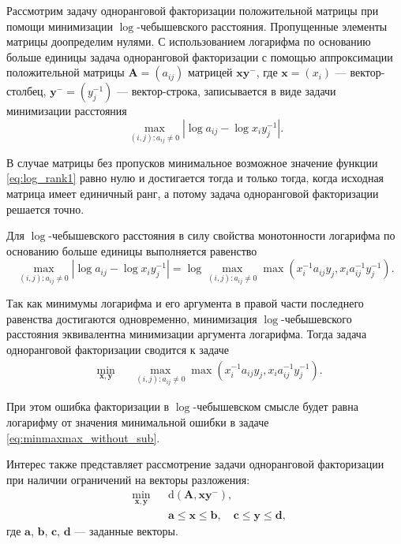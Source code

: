\documentclass[specialist,
               substylefile = spbu.rtx,
               subf,href,colorlinks=true, 12pt]{disser}
\theoremstyle{definition}
\begin{document}
Рассмотрим задачу одноранговой факторизации положительной матрицы при помощи минимизации $\log$-чебышевского расстояния. Пропущенные элементы матрицы доопределим нулями. С использованием логарифма по основанию больше единицы задача одноранговой факторизации с помощью аппроксимации положительной матрицы $\bm{A}=(a_{ij})$  матрицей $\bm{x}\bm{y}^{-}$, где $\bm{x}=(x_{i})$ --- вектор-столбец, $\bm{y}^{-}=(y_{j}^{-1})$ --- вектор-строка, записывается в виде задачи минимизации расстояния 
\begin{equation}\label{eq:log_rank1}
\max_{(i,j):a_{ij}\neq 0}
|\log a_{ij}-\log x_{i}y_{j}^{-1}|.
\end{equation}

В случае матрицы без пропусков минимальное возможное значение функции \eqref{eq:log_rank1} равно нулю и достигается тогда и только тогда, когда исходная матрица имеет единичный ранг, а потому задача одноранговой факторизации решается точно.

Для $\log$-чебышевского расстояния в силу свойства монотонности логарифма по основанию больше единицы выполняется равенство
\begin{equation*}
\max_{(i,j):a_{ij}\neq 0}
|\log a_{ij}-\log x_{i}y_{j}^{-1}|
=
\log
\max_{(i,j):a_{ij}\neq 0}\max(x_{i}^{-1}a_{ij}y_{j},x_{i}a_{ij}^{-1}y_{j}^{-1}).
\end{equation*}

Так как минимумы логарифма и его аргумента в правой части последнего равенства достигаются одновременно, минимизация $\log$-чебышевского расстояния  эквивалентна минимизации аргумента логарифма. Тогда задача одноранговой факторизации сводится к задаче 
\begin{equation}\label{eq:minmaxmax_without_sub}
\begin{aligned}
&
\min_{\bm{x},\bm{y}}
&&
\max_{(i,j):a_{ij}\neq 0}\max(x_{i}^{-1}a_{ij}y_{j},x_{i}a_{ij}^{-1}y_{j}^{-1}).
\end{aligned}
\end{equation}

При этом ошибка факторизации в $\log$-чебышевском смысле будет равна логарифму от значения минимальной ошибки в задаче \eqref{eq:minmaxmax_without_sub}. 

Интерес также представляет рассмотрение задачи 
одноранговой факторизации при наличии ограничений на векторы разложения:
\begin{equation}\label{eq:factorization}
\begin{aligned}
&
\min_{\bm{x},\bm{y}}
&&\mathrm{d}(\bm{A},\bm{x}\bm{y}^{-})
,\\
& &&\bm{a}\leq\bm{x}\leq\bm{b},
\quad
\bm{c}\leq\bm{y}\leq\bm{d},
\end{aligned}
\end{equation}
где $\bm{a}$, $\bm{b}$, $\bm{c}$, $\bm{d}$ --- заданные векторы.
\end{document}
